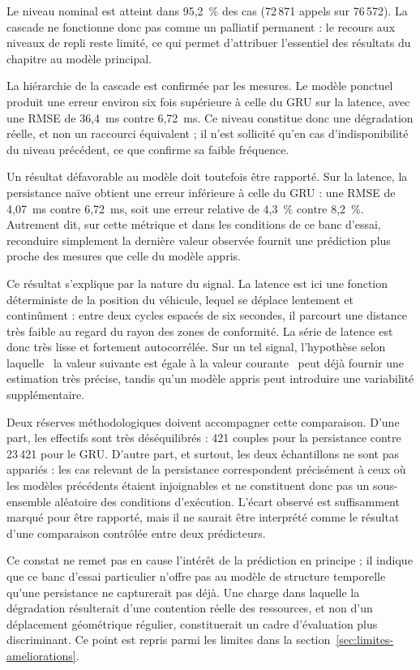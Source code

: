 Le niveau nominal est atteint dans 95,2~\% des cas (72\,871 appels sur 76\,572). La cascade ne fonctionne donc pas comme un palliatif permanent : le recours aux niveaux de repli reste limité, ce qui permet d'attribuer l'essentiel des résultats du chapitre au modèle principal.

La hiérarchie de la cascade est confirmée par les mesures. Le modèle ponctuel produit une erreur environ six fois supérieure à celle du GRU sur la latence, avec une RMSE de 36,4~ms contre 6,72~ms. Ce niveau constitue donc une dégradation réelle, et non un raccourci équivalent ; il n'est sollicité qu'en cas d'indisponibilité du niveau précédent, ce que confirme sa faible fréquence.

Un résultat défavorable au modèle doit toutefois être rapporté. Sur la latence, la persistance naïve obtient une erreur inférieure à celle du GRU : une RMSE de 4,07~ms contre 6,72~ms, soit une erreur relative de 4,3~\% contre 8,2~\%. Autrement dit, sur cette métrique et dans les conditions de ce banc d'essai, reconduire simplement la dernière valeur observée fournit une prédiction plus proche des mesures que celle du modèle appris.

Ce résultat s'explique par la nature du signal. La latence est ici une fonction déterministe de la position du véhicule, lequel se déplace lentement et continûment : entre deux cycles espacés de six secondes, il parcourt une distance très faible au regard du rayon des zones de conformité. La série de latence est donc très lisse et fortement autocorrélée. Sur un tel signal, l'hypothèse selon laquelle \og~la valeur suivante est égale à la valeur courante~\fg{} peut déjà fournir une estimation très précise, tandis qu'un modèle appris peut introduire une variabilité supplémentaire.

Deux réserves méthodologiques doivent accompagner cette comparaison. D'une part, les effectifs sont très déséquilibrés : 421 couples pour la persistance contre 23\,421 pour le GRU. D'autre part, et surtout, les deux échantillons ne sont pas appariés : les cas relevant de la persistance correspondent précisément à ceux où les modèles précédents étaient injoignables et ne constituent donc pas un sous-ensemble aléatoire des conditions d'exécution. L'écart observé est suffisamment marqué pour être rapporté, mais il ne saurait être interprété comme le résultat d'une comparaison contrôlée entre deux prédicteurs.

Ce constat ne remet pas en cause l'intérêt de la prédiction en principe ; il indique que ce banc d'essai particulier n'offre pas au modèle de structure temporelle qu'une persistance ne capturerait pas déjà. Une charge dans laquelle la dégradation résulterait d'une contention réelle des ressources, et non d'un déplacement géométrique régulier, constituerait un cadre d'évaluation plus discriminant. Ce point est repris parmi les limites dans la section~\ref{sec:limites-ameliorations}.

